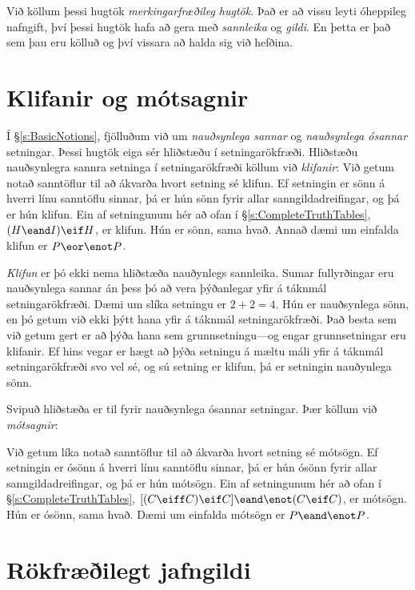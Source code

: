 Við köllum þessi hugtök \emph{merkingarfræðileg hugtök}. Það er að vissu leyti óheppileg nafngift, því þessi hugtök hafa að gera með \emph{sannleika} og \emph{gildi}. En þetta er það sem þau eru kölluð og því vissara að halda sig við hefðina.

\section{Klifanir og mótsagnir}

Í \S\ref{s:BasicNotions}, fjölluðum við um \emph{nauðsynlega sannar} og \emph{nauðsynlega ósannar} setningar. Þessi hugtök eiga sér hliðstæðu í setningarökfræði. Hliðstæðu nauðsynlegra sannra setninga í setningarökfræði köllum við \emph{klifanir}:
	Við getum notað sanntöflur til að ákvarða hvort setning sé klifun. Ef setningin er sönn á hverri línu sanntöflu sinnar, þá er hún sönn fyrir allar sanngildadreifingar, og þá er hún klifun. Ein af setningunum hér að ofan í \S\ref{s:CompleteTruthTables}, $(H \eand I) \eif H$, er klifun. Hún er sönn, sama hvað. Annað dæmi um einfalda klifun er $P \eor \enot P$.
	
\emph{Klifun} er þó ekki nema hliðstæða nauðynlegs sannleika. Sumar fullyrðingar eru nauðsynlega sannar án þess þó að vera þýðanlegar yfir á táknmál setningarökfræði. Dæmi um slíka setningu er $2+2=4$. Hún er nauðsynlega sönn, en þó getum við ekki þýtt hana yfir á táknmál setningarökfræði. Það besta sem við getum gert er að þýða hana sem grunnsetningu---og engar grunnsetningar eru klifanir. Ef hins vegar er hægt að þýða setningu á mæltu máli yfir á táknmál setningarökfræði svo vel sé, og sú setning er klifun, þá er setningin nauðynlega sönn.

Svipuð hliðstæða er til fyrir nauðsynlega ósannar setningar. Þær köllum við \emph{mótsagnir}:
	
Við getum líka notað sanntöflur til að ákvarða hvort setning sé mótsögn. Ef setningin er ósönn á hverri línu sanntöflu sinnar, þá er hún ósönn fyrir allar sanngildadreifingar, og þá er hún mótsögn. Ein af setningunum hér að ofan í \S\ref{s:CompleteTruthTables}, $[(C\eiff C) \eif C] \eand \enot(C \eif C)$, er mótsögn. Hún er ósönn, sama hvað. Dæmi um einfalda mótsögn er $P \eand \enot P$.

\section{Rökfræðilegt jafngildi}

